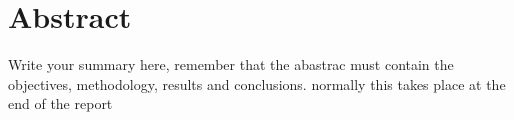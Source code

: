 \chapter{Abstract}
\label{cha:abstract}

Write your summary here, remember that the abastrac must contain the objectives, methodology, results and conclusions. normally this takes place at the end of the report

